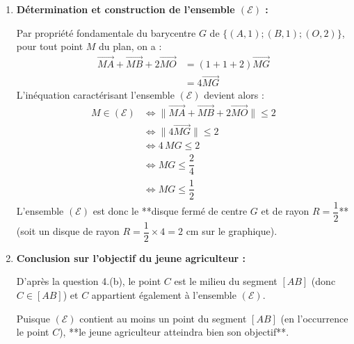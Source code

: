 \documentclass[12pt,a4paper]{article}
\begin{document}
\begin{enumerate}
\begin{enumerate}
        \item \textbf{Détermination de l'affixe $z_G$ du barycentre $G$ :}
        
        La somme des coefficients du système $\{(A, 1); (B, 1); (O, 2)\}$ vaut $1 + 1 + 2 = 4 \neq 0$. L'affixe de $G$ est donnée par :
        $$
        \begin{aligned}
            z_G &= \dfrac{1 \cdot z_A + 1 \cdot z_B + 2 \cdot z_O}{1 + 1 + 2} \\
            &= \dfrac{1 + i + 2(0)}{4} \\
            &= \dfrac{1 + i}{4} \\
            &= \dfrac{1}{4} + \dfrac{1}{4}i
        \end{aligned}
        $$
        Le point $G$ a pour coordonnées $\left(\dfrac{1}{4} \,;\, \dfrac{1}{4}\right)$ (soit $1 \text{ cm}$ en abscisse et $1 \text{ cm}$ en ordonnée sur le graphique, c'est-à-dire le milieu du segment $[OC]$).
    \end{enumerate}

    \item \textbf{Détermination et construction de l'ensemble $(\mathcal{E})$ :}
    
    Par propriété fondamentale du barycentre $G$ de $\{(A, 1); (B, 1); (O, 2)\}$, pour tout point $M$ du plan, on a :
    $$
    \begin{aligned}
        \overrightarrow{MA} + \overrightarrow{MB} + 2\overrightarrow{MO} &= (1 + 1 + 2)\overrightarrow{MG} \\
        &= 4\overrightarrow{MG}
    \end{aligned}
    $$
    L'inéquation caractérisant l'ensemble $(\mathcal{E})$ devient alors :
    $$
    \begin{aligned}
        M \in (\mathcal{E}) &\iff \lVert \overrightarrow{MA} + \overrightarrow{MB} + 2\overrightarrow{MO} \rVert \le 2 \\
        &\iff \lVert 4\overrightarrow{MG} \rVert \le 2 \\
        &\iff 4 \, MG \le 2 \\
        &\iff MG \le \dfrac{2}{4} \\
        &\iff MG \le \dfrac{1}{2}
    \end{aligned}
    $$
    L'ensemble $(\mathcal{E})$ est donc le **disque fermé de centre $G$ et de rayon $R = \dfrac{1}{2}$** (soit un disque de rayon $R = \dfrac{1}{2} \times 4 = 2 \text{ cm}$ sur le graphique).

    \item \textbf{Conclusion sur l'objectif du jeune agriculteur :}
    
    D'après la question 4.(b), le point $C$ est le milieu du segment $[AB]$ (donc $C \in [AB]$) et $C$ appartient également à l'ensemble $(\mathcal{E})$. 
    
    Puisque $(\mathcal{E})$ contient au moins un point du segment $[AB]$ (en l'occurrence le point $C$), **le jeune agriculteur atteindra bien son objectif**.
\end{enumerate}
\end{document}
